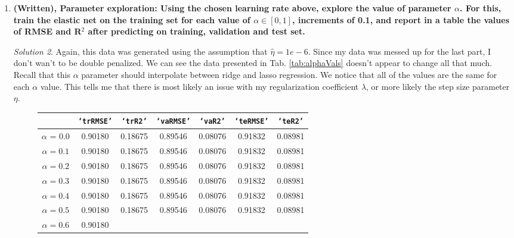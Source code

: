 \documentclass[a4paper,12pt]{article}
\theoremstyle{definition}
\theoremstyle{remark}
\newtheorem*{solution}{Solution}
\begin{document}
\begin{enumerate}
\begin{enumerate}
\begin{solution}
			But, alas, this homework is already late, so for the sake of the next two questions, which rely on this problem,  \textbf{we will use the heuristic that $\hat{\eta} = 1e-6$} for our chosen learning rate. This fits into classical optimization, but also is what SciKit-Learn recommends for their learning rate.
		\end{solution}
		\item {\bf (Written), Parameter exploration: Using the chosen learning rate above, explore the value of parameter $\alpha$. For this, train the elastic net on the training set for each value of $\alpha \in [0, 1]$, increments of 0.1, and report in a table the values of RMSE and R$^2$ after predicting on training, validation and test set.}
		\begin{solution}
			Again, this data was generated using the assumption that  $\hat{\eta} = 1e-6$. Since my data was messed up for the last part, I don't wan't to be double penalized. We can see the data presented in Tab. \ref{tab:alphaVals} doesn't appear to change all that much. Recall that this $\alpha$ parameter should interpolate between ridge and lasso regression. We notice that all of the values are the same for each $\alpha$ value. This tells me that there is most likely an issue with my regularization coefficient $\lambda$, or more likely the step size parameter $\eta$.
			\begin{figure}
				\centering
				\begin{tabular}{|c|cc|cc|cc|}
				\hline
				& \texttt{`trRMSE'} & \texttt{`trR2'}  &  \texttt{`vaRMSE'} & \texttt{`vaR2'} & \texttt{`teRMSE'}& \texttt{`teR2'} \\
				\hline
				$\alpha$ = 0.0& 0.90180&
				0.18675&
				0.89546&
				0.08076&
				0.91832&
				0.08981\\
				\hline
				$\alpha = 0.1$&0.90180&
				0.18675&
				0.89546&
				0.08076&
				0.91832&
				0.08981\\
				\hline
				$\alpha = 0.2$&  0.90180&
				0.18675&
				0.89546&
				0.08076&
				0.91832&
				0.08981\\
				\hline
				$\alpha = 0.3$&0.90180&
				0.18675&
				0.89546&
				0.08076&
				0.91832&
				0.08981\\
				\hline
				$\alpha = 0.4$&0.90180&
				0.18675&
				0.89546&
				0.08076&
				0.91832&
				0.08981\\
				\hline
				$\alpha = 0.5$& 0.90180&
				0.18675&
				0.89546&
				0.08076&
				0.91832&
				0.08981\\
				\hline
				$\alpha = 0.6$&  0.90180&

\end{tabular}
\end{figure}
\end{solution}
\end{enumerate}
\end{enumerate}
\end{document}
